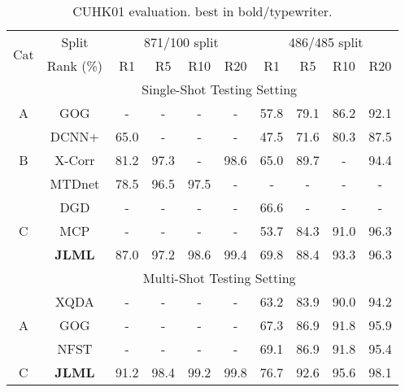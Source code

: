 \documentclass{article}
\begin{document}
\begin{table} [!h]
	\centering
	\footnotesize
	\renewcommand{\arraystretch}{1}
	\setlength{\tabcolsep}{0.1 cm}
	\vspace{-.3cm}
	\caption{\footnotesize
		CUHK01 evaluation.  best in bold/typewriter.
}
	\vskip 0pt \begin{tabular}{|c||c|cccc|cccc|}
		\hline
\multirow{2}{*}{Cat}
		& Split &  \multicolumn{4}{c|}{871/100 split} &\multicolumn{4}{c|}{486/485 split} \\ \cline{2-10}
		& Rank (\%) & R1 & R5 & R10 & R20 & R1 & R5 & R10 & R20 \\ \hline \hline
		&  \multicolumn{9}{c|}{Single-Shot Testing Setting} \\ \cline{1-10}
		\multirow{1}{*}{A}
& GOG & -  & -  &  - &  - 
		& 57.8 & 79.1 & 86.2 & 92.1 \\
		\hline
		\multirow{3}{*}{B}
		& DCNN+ & 65.0  & -  &  - &  -   
		& 47.5  & 71.6  &  80.3 &  87.5 \\  & X-Corr & \color{blue} 81.2  & \color{red} {97.3}  &  - & \color{blue} 98.6  
		 & 65.0  & \color{red} {89.7}  &  - & 94.4 \\ 
		& MTDnet & 78.5 & 96.5 & \color{blue} 97.5 & - & -  & -  &  - &  - \\ \hline
		\multirow{3}{*}{C}
& DGD & -  & -  &  - &  -   
		& \color{blue} 66.6  & -  &  - &  -\\ 
		& MCP & -  & -  &  - &  -   
		& 53.7  & 84.3  & \color{blue} 91.0 & \color{red} 96.3 \\
& {\bf JLML} & \color{red} {87.0} & \color{blue} 97.2  & \color{red} {98.6} & \color{red} {99.4}  
		& \color{red} {69.8 } & \color{blue} 88.4  & \color{red} {93.3} & \color{red} 96.3 \\ 

		\hline \hline
		&  \multicolumn{9}{c|}{Multi-Shot Testing Setting} \\ \cline{1-10}
		\multirow{3}{*}{A}
		& XQDA & -  & -  &  - &  -   & 63.2  & 83.9  &  90.0 &  94.2 \\   & GOG & -  & -  &  - & - & 67.3  & \color{blue} 86.9  & \color{blue} 91.8 & \color{blue} 95.9 \\  

		& NFST		& -  & -  & - & -   & \color{blue} 69.1  & \color{blue} 86.9 & \color{blue} 91.8 &  95.4 \\ 
		\hline
		\multirow{1}{*}{C}
		& {\bf JLML} & \color{red} 91.2 & \color{red} 98.4 & \color{red} 99.2 & \color{red} 99.8
		& \color{red} 76.7 & \color{red} 92.6 & \color{red} 95.6 & \color{red} 98.1 \\ \hline
	\end{tabular}\label{tab:res_cuhk01}
	\vspace{-.3cm}
\end{table}
\end{document}
